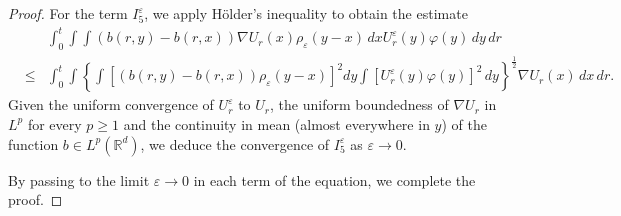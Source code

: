 \documentclass[12pt,oneside, reqno]{amsart}
\newcommand{\ce}{\begin{eqnarray*}}
\newcommand{\de}{\end{eqnarray*}}
\def\mR{{\mathbb R}}
\def\geq{\geqslant}
\def\leq{\leqslant}
\numberwithin{equation}{section}
\begin{document}
\begin{proof}
For the term 
 $I_5^\varepsilon$, we apply H\"{o}lder's inequality to obtain the estimate 
	\ce 
	&&\int_0^t\int \int (b(r,y)-b(r,x))\nabla U_r(x) \rho_\varepsilon(y-x)\,dx U_r^\varepsilon(y) \varphi(y) \,dy \,dr\\
	&\leq &\int_0^t\int \left\{\int [(b(r,y)-b(r,x)) \rho_\varepsilon(y-x)]^2dy\int[ U_r^\varepsilon(y) \varphi(y)]^2 \,dy\right\}^{\frac{1}{2}}\nabla U_r(x)\,dx \,dr.
	\de 
Given the uniform convergence of $U_r^\varepsilon$ to $U_r$, the uniform boundedness of $\nabla U_r$ in $L^p$ for every $p\geq 1$ and  the continuity in mean (almost everywhere in $y$) of the function $b\in L^p(\mR^d)$, we deduce the convergence of $I_5^\varepsilon$ as $\varepsilon\to 0$. 
	
	By passing to the limit $\varepsilon\to 0$ in each term of the equation, we complete the proof. 
\end{proof}
\end{document}
